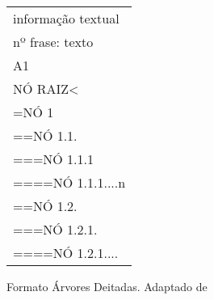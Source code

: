 \begin{figure}[!h]
    \centering
    \begin{tabular}{l}
        informação textual\\
        nº frase: texto\\
        A1\\
        NÓ RAIZ<\\
        =NÓ 1\\
        ==NÓ 1.1.\\
        ===NÓ 1.1.1\\
        ====NÓ 1.1.1....n\\
        ==NÓ 1.2.\\
        ===NÓ 1.2.1.\\
        ====NÓ 1.2.1....\\
    \end{tabular}
    \caption[Formato Árvores Deitadas]{Formato Árvores Deitadas. Adaptado de }
    \label{fig:bosque_ad}
\end{figure}